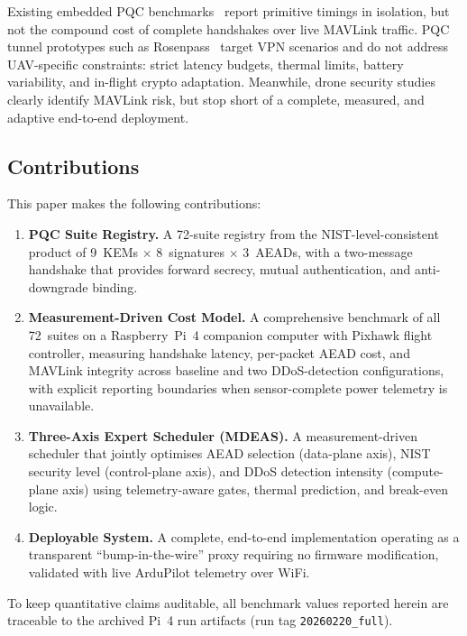 \documentclass[conference]{IEEEtran}
\begin{document}
Existing embedded PQC benchmarks~\cite{pqm4, pqc-arm-bench} report primitive timings in isolation, but not the compound cost of complete handshakes over live MAVLink traffic.
PQC tunnel prototypes such as Rosenpass~\cite{rosenpass} target VPN scenarios and do not address UAV-specific constraints: strict latency budgets, thermal limits, battery variability, and in-flight crypto adaptation.
Meanwhile, drone security studies~\cite{drone-security-survey, drone-pqc-analysis} clearly identify MAVLink risk, but stop short of a complete, measured, and adaptive end-to-end deployment.

\subsection{Contributions}

This paper makes the following contributions:

\begin{enumerate}[label=\textbf{C\arabic*}, leftmargin=2em]
    \item \textbf{PQC Suite Registry.} A 72-suite registry from the NIST-level-consistent product of 9~KEMs $\times$ 8~signatures $\times$ 3~AEADs, with a two-message handshake that provides forward secrecy, mutual authentication, and anti-downgrade binding.

    \item \textbf{Measurement-Driven Cost Model.} A comprehensive benchmark of all 72~suites on a Raspberry~Pi~4 companion computer with Pixhawk flight controller, measuring handshake latency, per-packet AEAD cost, and MAVLink integrity across baseline and two DDoS-detection configurations, with explicit reporting boundaries when sensor-complete power telemetry is unavailable.

    \item \textbf{Three-Axis Expert Scheduler (MDEAS).} A measurement-driven scheduler that jointly optimises AEAD selection (data-plane axis), NIST security level (control-plane axis), and DDoS detection intensity (compute-plane axis) using telemetry-aware gates, thermal prediction, and break-even logic.

    \item \textbf{Deployable System.} A complete, end-to-end implementation operating as a transparent ``bump-in-the-wire'' proxy requiring no firmware modification, validated with live ArduPilot telemetry over WiFi.
\end{enumerate}

To keep quantitative claims auditable, all benchmark values reported herein are traceable to the archived Pi~4 run artifacts (run tag \texttt{20260220\_full}).
\end{document}
